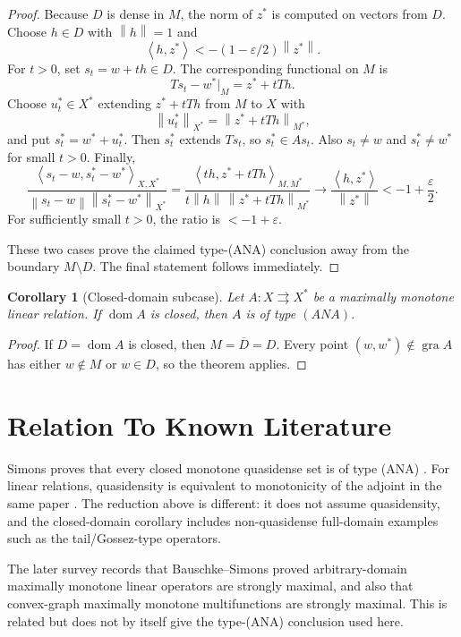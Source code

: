 \documentclass[11pt]{article}
\newtheorem{corollary}{Corollary}
\newcommand{\eps}{\varepsilon}
\newcommand{\gra}{\operatorname{gra}}
\newcommand{\dom}{\operatorname{dom}}
\newcommand{\norm}[1]{\left\lVert #1\right\rVert}
\newcommand{\ip}[2]{\left\langle #1,#2\right\rangle}
\newcommand{\restr}[1]{\big|_{#1}}
\begin{document}
\begin{proof}
Because \(D\) is dense in \(M\), the norm of \(z^*\) is computed on
vectors from \(D\). Choose \(h\in D\) with \(\norm h=1\) and
\[
\ip{h}{z^*}<-(1-\eps/2)\norm{z^*}.
\]
For \(t>0\), set \(s_t=w+th\in D\). The corresponding functional on
\(M\) is
\[
T s_t-w^*\restr M=z^*+tTh.
\]
Choose \(u_t^*\in X^*\) extending \(z^*+tTh\) from \(M\) to \(X\) with
\[
\norm{u_t^*}_{X^*}=\norm{z^*+tTh}_{M^*},
\]
and put \(s_t^*=w^*+u_t^*\). Then \(s_t^*\) extends \(T s_t\), so
\(s_t^*\in A s_t\). Also \(s_t\ne w\) and \(s_t^*\ne w^*\) for small
\(t>0\). Finally,
\[
\frac{\ip{s_t-w}{s_t^*-w^*}_{X,X^*}}
{\norm{s_t-w}\norm{s_t^*-w^*}_{X^*}}
=
\frac{\ip{th}{z^*+tTh}_{M,M^*}}
{t\norm h\,\norm{z^*+tTh}_{M^*}}
\longrightarrow
\frac{\ip{h}{z^*}}{\norm{z^*}}
<-1+\frac{\eps}{2}.
\]
For sufficiently small \(t>0\), the ratio is \(<-1+\eps\).

These two cases prove the claimed type-(ANA) conclusion away from the
boundary \(M\setminus D\). The final statement follows immediately.
\end{proof}

\begin{corollary}[Closed-domain subcase]
Let \(A:X\rightrightarrows X^*\) be a maximally monotone linear relation.
If \(\dom A\) is closed, then \(A\) is of type \((ANA)\).
\end{corollary}

\begin{proof}
If \(D=\dom A\) is closed, then \(M=\overline D=D\). Every point
\((w,w^*)\notin\gra A\) has either \(w\notin M\) or \(w\in D\), so the
theorem applies.
\end{proof}

\section*{Relation To Known Literature}

Simons proves that every closed monotone quasidense set is of type (ANA)
\cite[theorem labeled \texttt{ANAthm}]{SimonsDensities}. For linear
relations, quasidensity is equivalent to monotonicity of the adjoint in
the same paper \cite[theorem labeled \texttt{LINMONthm}]{SimonsDensities}.
The reduction above is different: it does not assume quasidensity, and
the closed-domain corollary includes non-quasidense full-domain examples
such as the tail/Gossez-type operators.

The later survey \cite{SimonsSurvey} records that Bauschke--Simons
proved arbitrary-domain maximally monotone linear operators are strongly
maximal, and also that convex-graph maximally monotone multifunctions
are strongly maximal. This is related but does not by itself give the
type-(ANA) conclusion used here.
\end{document}
